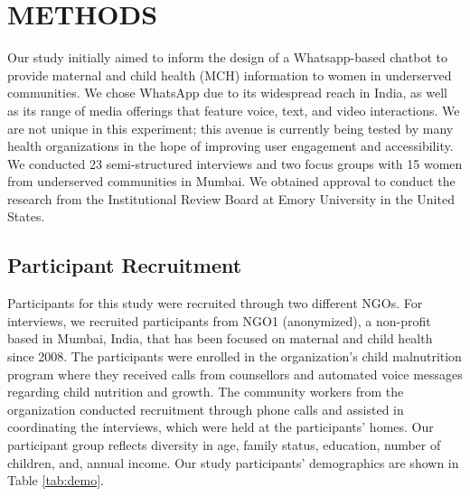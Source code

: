 \section{METHODS}
Our study initially aimed to inform the design of a Whatsapp-based chatbot to provide maternal and child health (MCH) information to women in underserved communities. We chose WhatsApp due to its widespread reach in India, as well as its range of media offerings that feature voice, text, and video interactions. We are not unique in this experiment; this avenue is currently being tested by many health organizations in the hope of improving user engagement and accessibility. %
We conducted 23 semi-structured interviews and two focus groups with 15 women from underserved communities in Mumbai. %
We obtained approval to conduct the research from the Institutional Review Board at Emory University in the United States.

\subsection{Participant Recruitment}
Participants for this study were recruited through two different NGOs. For interviews, we recruited participants from NGO1 (anonymized), a non-profit based in Mumbai, India, that has been focused on maternal and child health since 2008. The participants were enrolled in the organization's child malnutrition program where they received calls from counsellors and automated voice messages regarding child nutrition and growth. The community workers from the organization conducted recruitment through phone calls and assisted in coordinating the interviews, which were held at the participants' homes. Our participant group reflects diversity in age, family status, education, number of children, and, annual income. Our study participants' demographics are shown in Table \ref{tab:demo}. 



